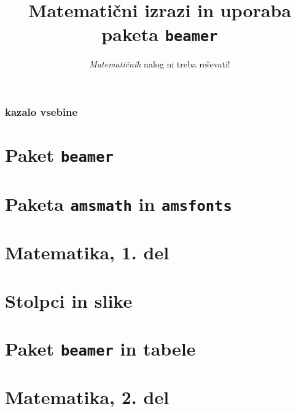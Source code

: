 \documentclass{beamer}
\title{Matematični izrazi in uporaba paketa \texttt{beamer}}
\subtitle{\emph{Matematičnih} nalog ni treba reševati!}
\institute{Fakulteta za matematiko in fiziko}
\date{}
\begin{document}
\frame{\titlepage}

\begin{frame}
\frametitle{kazalo vsebine}
\tableofcontents


\end{frame}


\section{Paket \texttt{beamer}}

\section{Paketa \texttt{amsmath} in \texttt{amsfonts}}

\section[Matematika, 1. del\\\large{Analiza, logika, množice}]{Matematika, 1. del}

\section{Stolpci in slike}

\section{Paket \texttt{beamer} in tabele}

\section[Matematika, 2. del\\\large{Zaporedja, algebra, grupe}]{Matematika, 2. del}
\end{document}
